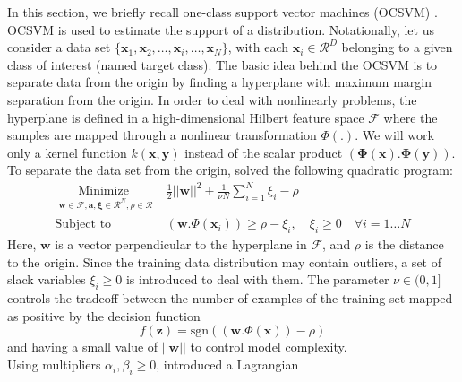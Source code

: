 \documentclass[conference]{IEEEtran}
\theoremstyle{problemstyle}
\begin{document}
In this section, we briefly recall one-class support vector machines (OCSVM) \cite{scholkopf2000support}. OCSVM is used to estimate the support of a distribution.
Notationally, let us consider a data set $\{\mathbf{x}_1,\mathbf{x}_2,\ldots,\mathbf{x}_i, \ldots,\mathbf{x}_N\}$, 
with each $\mathbf{x}_i\in \mathcal{R}^D$ belonging to a given class of interest (named target class). 
The basic idea behind the OCSVM is to separate data from the origin by finding a hyperplane with maximum margin separation from
the origin. In order to deal with nonlinearly problems, the hyperplane is defined in a high-dimensional Hilbert feature space $\mathcal{F}$ where
the samples are mapped through a nonlinear transformation $\Phi(.)$. We will work only a kernel function $k(\mathbf{x},\mathbf{y})$ instead of the scalar 
product $(\boldsymbol{\Phi}(\mathbf{x}).\boldsymbol{\Phi}(\mathbf{y}))$. To separate the data set from the 
origin, \cite{scholkopf2001estimating} solved the following quadratic program:
\begin{subequations}\label{euq:ocsvm}
\begin{align}
\underset{
	\begin{array}{c}
		 \mathbf{w}\in \mathcal{F}, \mathbf{a}, \boldsymbol{\xi} \in \mathcal{R}^N, \rho\in \mathcal{R}
	\end{array}}{\text{Minimize }} & \frac{1}{2}\left|\left| \mathbf{w}\right|\right|^2 + \frac{1}{\nu N}\sum_{i=1}^N\xi_i -\rho\\
	\label{euq:constraints}
\text{Subject to } &  (\mathbf{w}.\Phi(\mathbf{x}_i))\geq \rho -\xi_i, \quad \xi_i \ge 0 \quad \forall i=1\ldots N
\end{align}
\end{subequations}
Here, $\mathbf{w}$ is a vector perpendicular to the hyperplane in $\mathcal{F}$, and $\rho$ is the 
distance to the origin. Since the training data distribution
may contain outliers, a set of slack variables $\xi_i\geq0$ is introduced to deal with them. The
parameter $\nu \in (0,1]$ controls the tradeoff between the number
of examples of the training set mapped as positive by the
decision function
\begin{equation}
\label{equ:defosvm}
f(\mathbf{z})=\text{sgn}((\mathbf{w}.\Phi(\mathbf{x}))- \rho)
\end{equation}
and having a small value of $\left|\left| \mathbf{w}\right|\right|$ to control model complexity.\\

Using multipliers $\alpha_i,\beta_i\geq0$, \cite{scholkopf2001estimating} introduced a Lagrangian
\end{document}
